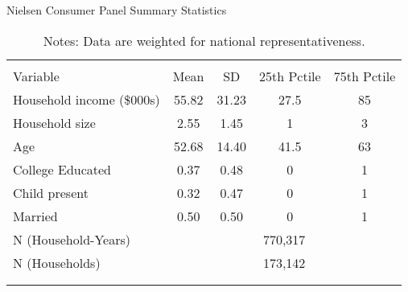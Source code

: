 \begin{table}[!htbp] \centering
\caption{Nielsen Consumer Panel Summary Statistics}
\label{tab:homescanSummaryStats}
\begin{tabular}{lcccc}
\\[-1.8ex]\hline
\hline \\[-1.8ex]
Variable                  & Mean  & SD    & 25th Pctile & 75th Pctile\\
\hline
Household income (\$000s) & 55.82 & 31.23 & 27.5        & 85 \\
Household size            & 2.55  & 1.45  & 1           & 3 \\
Age                       & 52.68 & 14.40 & 41.5        & 63 \\
College Educated          & 0.37  & 0.48  & 0           & 1 \\
Child present             & 0.32  & 0.47  & 0           & 1 \\
Married                   & 0.50  & 0.50  & 0           & 1 \\
\hline
N (Household-Years)       & \multicolumn{4}{c}{770,317} \\
N (Households)            & \multicolumn{4}{c}{173,142} \\
\\[-1.8ex]\hline
\hline \\[-1.8ex]
\end{tabular}
\caption*{Notes: Data are weighted for national representativeness.}
\end{table}
